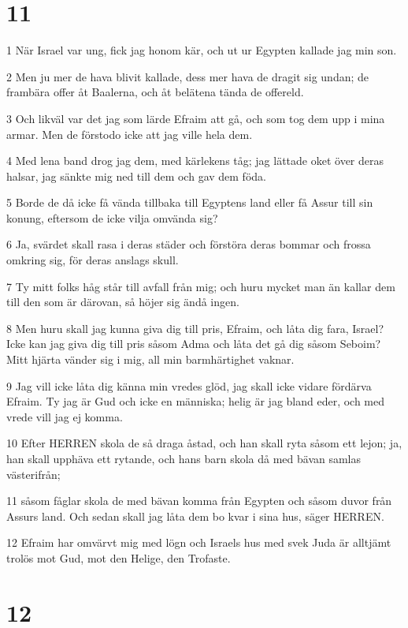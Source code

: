 \chapter{11}

\par 1 När Israel var ung, fick jag honom kär, och ut ur Egypten kallade jag min son.
\par 2 Men ju mer de hava blivit kallade, dess mer hava de dragit sig undan; de frambära offer åt Baalerna, och åt belätena tända de offereld.
\par 3 Och likväl var det jag som lärde Efraim att gå, och som tog dem upp i mina armar. Men de förstodo icke att jag ville hela dem.
\par 4 Med lena band drog jag dem, med kärlekens tåg; jag lättade oket över deras halsar, jag sänkte mig ned till dem och gav dem föda.
\par 5 Borde de då icke få vända tillbaka till Egyptens land eller få Assur till sin konung, eftersom de icke vilja omvända sig?
\par 6 Ja, svärdet skall rasa i deras städer och förstöra deras bommar och frossa omkring sig, för deras anslags skull.
\par 7 Ty mitt folks håg står till avfall från mig; och huru mycket man än kallar dem till den som är därovan, så höjer sig ändå ingen.
\par 8 Men huru skall jag kunna giva dig till pris, Efraim, och låta dig fara, Israel? Icke kan jag giva dig till pris såsom Adma och låta det gå dig såsom Seboim? Mitt hjärta vänder sig i mig, all min barmhärtighet vaknar.
\par 9 Jag vill icke låta dig känna min vredes glöd, jag skall icke vidare fördärva Efraim. Ty jag är Gud och icke en människa; helig är jag bland eder, och med vrede vill jag ej komma.
\par 10 Efter HERREN skola de så draga åstad, och han skall ryta såsom ett lejon; ja, han skall upphäva ett rytande, och hans barn skola då med bävan samlas västerifrån;
\par 11 såsom fåglar skola de med bävan komma från Egypten och såsom duvor från Assurs land. Och sedan skall jag låta dem bo kvar i sina hus, säger HERREN.
\par 12 Efraim har omvärvt mig med lögn och Israels hus med svek Juda är alltjämt trolös mot Gud, mot den Helige, den Trofaste.

\chapter{12}

